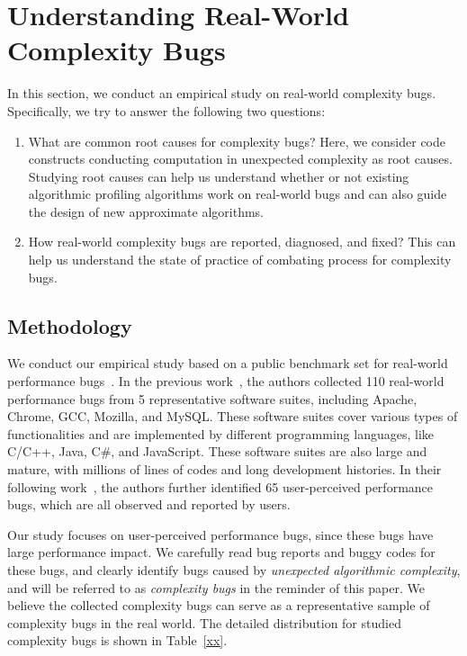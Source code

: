 \section{Understanding Real-World Complexity Bugs}
\label{sec:study}


In this section, we conduct an empirical study on real-world complexity bugs. 
Specifically, we try to answer the following two questions:

\begin{enumerate}

\item What are common root causes for complexity bugs? 
Here, we consider code constructs conducting computation in unexpected complexity as root causes. 
Studying root causes can help us understand whether or not 
existing algorithmic profiling algorithms work on real-world bugs 
and can also guide the design of new approximate algorithms. 

\item How real-world complexity bugs are reported, diagnosed, and fixed?
This can help us understand the state of practice of combating process for complexity bugs. 

\end{enumerate}


\subsection{Methodology}
\label{sec:meth}

We conduct our empirical study based on a public benchmark set for 
real-world performance bugs~\cite{PerfBug,SongOOPSLA2014}. 
In the previous work~\cite{PerfBug}, the authors collected 110 real-world 
performance bugs from 5 representative 
software suites, including Apache, Chrome, GCC, Mozilla, and MySQL. 
These software suites cover various types of functionalities and 
are implemented by different programming languages, 
like C/C++, Java, C\#, and JavaScript. 
These software suites are also large and mature, 
with millions of lines of codes and long development histories. 
In their following work~\cite{SongOOPSLA2014}, 
the authors further identified 65 user-perceived performance bugs, 
which are all observed and reported by users. 


Our study focuses on user-perceived performance bugs, 
since these bugs have large performance impact.
We carefully read bug reports and buggy codes for these bugs, 
and clearly identify \ComBugs bugs caused by {\textit{unexpected algorithmic complexity}},
and will be referred to as {\textit{complexity bugs}} in the reminder of this paper. 
We believe the collected complexity bugs can serve as a representative sample 
of complexity bugs in the real world. 
The detailed distribution for studied complexity bugs is shown in Table~\ref{xx}. 


